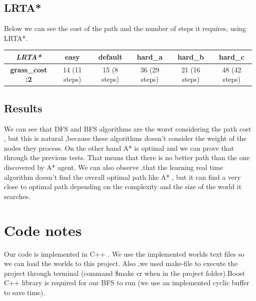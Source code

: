 \documentclass{article}
\begin{document}
\subsection{LRTA*}
Below we can see the cost of the path and the number of steps it requires, using LRTA*.

\begin{table}[!htb]
\centering
\begin{tabular}{|c|c|c|c|c|c|}
\hline
\textit{\textbf{LRTA*}} & \textbf{easy} & \textbf{default} & \textbf{hard\_a} & \textbf{hard\_b} & \textbf{hard\_c} \\ \hline
\textbf{grass\_cost :2} & 14 (11 steps) & 15 (8 steps) & 36 (29 steps) & 21 (16 steps) & 48 (42 steps) \\ \hline
\end{tabular}
\end{table}

\subsection{Results}
We can see that DFS and BFS algorithms are the worst considering the path cost , but this is natural ,because these algorithms doesn't consider the weight of the nodes they process. On the other hand A* is optimal and we can prove that through the previous tests. That means that there is no better path than the one discovered by A* agent.
We can also observe ,that the learning real time algorithm doesn't find the overall optimal path like A* , but it can find a very close to optimal path depending on the complexity and the size of the world it searches.
\section*{Code notes}
Our code is implemented in C++ . We use the implemented worlds text files so we can load the worlds to this project. Also ,we used make-file to execute the project through terminal (command \$make cr when in the project folder).Boost C++ library is required for our BFS to run (we use an implemented cyclic buffer to save time).
\end{document}
